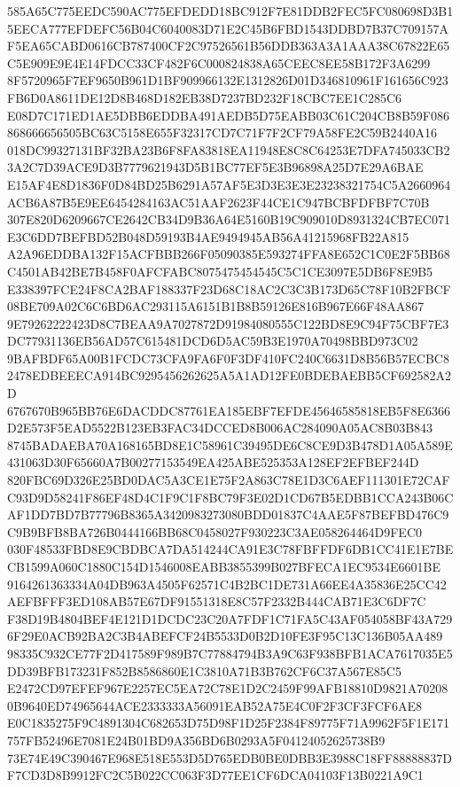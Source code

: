 \documentclass[UTF8,fontset=fandol,zihao=-4,a4paper]{ctexart}
\begin{document}
{{585A65C775EEDC590AC775EFDEDD18BC912F7E81DDB2FEC5FC080698D3B15EECA777EFDEFC56B04C6040083D71E2C45B6FBD1543DDBD7B37C709157A
F5EA65CABD0616CB787400CF2C97526561B56DDB363A3A1AAA38C67822E65C5E909E9E4E14FDCC33CF482F6C000824838A65CEEC8EE58B172F3A6299
8F5720965F7EF9650B961D1BF909966132E1312826D01D346810961F161656C923FB6D0A8611DE12D8B468D182EB38D7237BD232F18CBC7EE1C285C6
E08D7C171ED1AE5DBB6EDDBA491AEDB5D75EABB03C61C204CB8B59F086868666656505BC63C5158E655F32317CD7C71F7F2CF79A58FE2C59B2440A16
018DC99327131BF32BA23B6F8FA83818EA11948E8C8C64253E7DFA745033CB23A2C7D39ACE9D3B7779621943D5B1BC77EF5E3B96898A25D7E29A6BAE
E15AF4E8D1836F0D84BD25B6291A57AF5E3D3E3E3E23238321754C5A2660964ACB6A87B5E9EE6454284163AC51AAF2623F44CE1C947BCBFDFBF7C70B
307E820D6209667CE2642CB34D9B36A64E5160B19C909010D8931324CB7EC071E3C6DD7BEFBD52B048D59193B4AE9494945AB56A41215968FB22A815
A2A96EDDBA132F15ACFBBB266F05090385E593274FFA8E652C1C0E2F5BB68C4501AB42BE7B458F0AFCFABC8075475454545C5C1CE3097E5DB6F8E9B5
E338397FCE24F8CA2BAF188337F23D68C18AC2C3C3B173D65C78F10B2FBCF08BE709A02C6C6BD6AC293115A6151B1B8B59126E816B967E66F48AA867
9E79262222423D8C7BEAA9A7027872D91984080555C122BD8E9C94F75CBF7E3DC77931136EB56AD57C615481DCD6D5AC59B3E1970A70498BBD973C02
9BAFBDF65A00B1FCDC73CFA9FA6F0F3DF410FC240C6631D8B56B57ECBC82478EDBEEECA914BC9295456262625A5A1AD12FE0BDEBAEBB5CF692582A2D
6767670B965BB76E6DACDDC87761EA185EBF7EFDE45646585818EB5F8E6366D2E573F5EAD5522B123EB3FAC34DCCED8B006AC284090A05AC8B03B843
8745BADAEBA70A168165BD8E1C58961C39495DE6C8CE9D3B478D1A05A589E431063D30F65660A7B00277153549EA425ABE525353A128EF2EFBEF244D
820FBC69D326E25BD0DAC5A3CE1E75F2A863C78E1D3C6AEF111301E72CAFC93D9D58241F86EF48D4C1F9C1F8BC79F3E02D1CD67B5EDBB1CCA243B06C
AF1DD7BD7B77796B8365A3420983273080BDD01837C4AAE5F87BEFBD476C9C9B9BFB8BA726B0444166BB68C0458027F930223C3AE058264464D9FEC0
030F48533FBD8E9CBDBCA7DA514244CA91E3C78FBFFDF6DB1CC41E1E7BECB1599A060C1880C154D1546008EABB3855399B027BFECA1EC9534E6601BE
9164261363334A04DB963A4505F62571C4B2BC1DE731A66EE4A35836E25CC42AEFBFFF3ED108AB57E67DF91551318E8C57F2332B444CAB71E3C6DF7C
F38D19B4804BEF4E121D1DCDC23C20A7FDF1C71FA5C43AF054058BF43A7296F29E0ACB92BA2C3B4ABEFCF24B5533D0B2D10FE3F95C13C136B05AA489
98335C932CE77F2D417589F989B7C77884794B3A9C63F938BFB1ACA7617035E5DD39BFB173231F852B8586860E1C3810A71B3B762CF6C37A567E85C5
E2472CD97EFEF967E2257EC5EA72C78E1D2C2459F99AFB18810D9821A702080B9640ED74965644ACE2333333A56091EAB52A75E4C0F2F3CF3FCF6AE8
E0C1835275F9C4891304C682653D75D98F1D25F2384F89775F71A9962F5F1E171757FB52496E7081E24B01BD9A356BD6B0293A5F04124052625738B9
73E74E49C390467E968E518E553D5D765EDB0BE0DBB3E3988C18FF88888837DF7CD3D8B9912FC2C5B022CC063F3D77EE1CF6DCA04103F13B0221A9C1
}}
\end{document}

